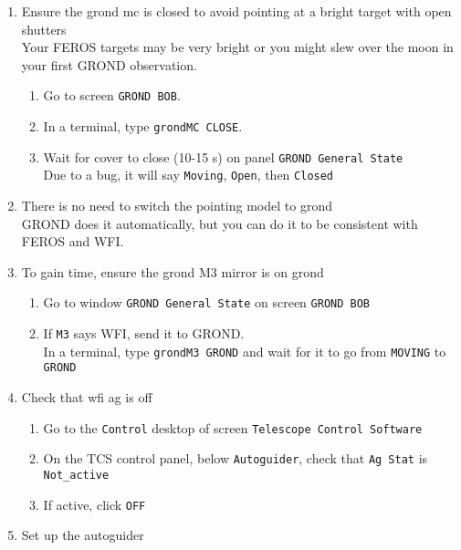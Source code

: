 \documentclass[11pt,fleqn,a4paper]{book}
\begin{document}
\begin{enumerate}
  \item Ensure the \gls{grond} \gls{mc} is closed to avoid \gls{pointing} at a bright target with open shutters\\
        Your FEROS targets may be very bright or you might slew over the moon in your first GROND observation.\label{list:switch-mcclose}
  \begin{enumerate}
    \item Go to screen \texttt{GROND BOB}.
    \item In a terminal, type \texttt{\gls{grondMC} CLOSE}.
    \item Wait for cover to close (10-15 s) on panel \texttt{GROND \gls{General State}}\\
          Due to a bug, it will say \texttt{Moving}, \texttt{Open}, then \texttt{Closed}
  \end{enumerate}
  \item There is no need to switch the \gls{pointing model} to \gls{grond}\\
        GROND does it automatically, but you can do it to be consistent with FEROS and WFI.
  \item To gain time, ensure the \gls{grond} \gls{M3} mirror is on \gls{grond}
  \begin{enumerate}
    \item Go to window \texttt{GROND \gls{General State}} on screen \texttt{GROND BOB}
    \item If \texttt{\gls{M3}} says WFI\label{list:grond:checkm3}, send it to GROND.\\
            In a terminal, type \texttt{\gls{grondM3} GROND} and wait for it to go from \texttt{MOVING} to \texttt{GROND}
    \end{enumerate}
    \item Check that \gls{wfi} \gls{ag} is off 
    \begin{enumerate}
        \item Go to the \texttt{Control} \gls{desktop} of screen \texttt{Telescope Control Software}
        \item On the \gls{TCS control panel}, below \texttt{Autoguider}, check that \texttt{Ag Stat} is \texttt{Not\_active}
        \item If active, click \texttt{OFF} 
    \end{enumerate}
  \item Set up the autoguider 
  \begin{enumerate}

\end{enumerate}
\end{enumerate}
\end{document}
